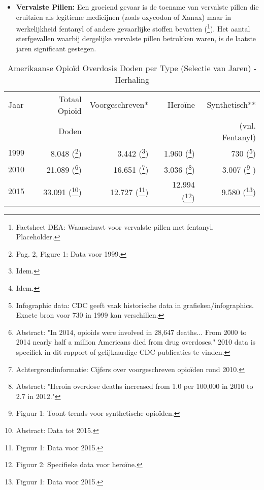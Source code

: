 \documentclass[11pt, a4paper]{report} %
\begin{document}
\begin{itemize}
    \item \textbf{Vervalste Pillen:} Een groeiend gevaar is de toename van vervalste pillen die eruitzien als legitieme medicijnen (zoals oxycodon of Xanax) maar in werkelijkheid fentanyl of andere gevaarlijke stoffen bevatten (\cite{DEA2022FentanylFactSheet}\footnote{Factsheet DEA: Waarschuwt voor vervalste pillen met fentanyl. Placeholder.}). Het aantal sterfgevallen waarbij dergelijke vervalste pillen betrokken waren, is de laatste jaren significant gestegen.
\end{itemize}

\begin{table}[htbp]
    \centering
    \caption{Amerikaanse Opioïd Overdosis Doden per Type (Selectie van Jaren) - Herhaling}
    \label{tab:overdose_data_repeat} %
    \begin{tabular}{l r r r r}
        \toprule
        Jaar & Totaal Opioïd & Voorgeschreven* & Heroïne & Synthetisch** \\
             & Doden         &              &         & (vnl. Fentanyl) \\
        \midrule
        1999 & 8.048   (\cite{Hedegaard2017OverdoseDeathsUS}\footnote{Pag. 2, Figure 1: Data voor 1999.})      & 3.442   (\cite{Hedegaard2017OverdoseDeathsUS}\footnote{Idem.})     & 1.960   (\cite{Hedegaard2017OverdoseDeathsUS}\footnote{Idem.}) & 730 (\cite{CDCUnderstandingEpidemic}\footnote{Infographic data: CDC geeft vaak historische data in grafieken/infographics. Exacte bron voor 730 in 1999 kan verschillen.}) \\
        2010 & 21.089  (\cite{Rudd2016IncreasesDrugOpioidOverdoseDeaths}\footnote{Abstract: "In 2014, opioids were involved in 28,647 deaths... From 2000 to 2014 nearly half a million Americans died from drug overdoses." 2010 data is specifiek in dit rapport of gelijkaardige CDC publicaties te vinden.})      & 16.651  (\cite{CDCVitalSigns2017}\footnote{Achtergrondinformatie: Cijfers over voorgeschreven opioïden rond 2010.})    & 3.036   (\cite{Rudd2014IncreasesHeroinOverdoseDeaths}\footnote{Abstract: "Heroin overdose deaths increased from 1.0 per 100,000 in 2010 to 2.7 in 2012."}) & 3.007 (\cite{CDC2022DataBrief457}\footnote{Figuur 1: Toont trends voor synthetische opioïden.} ) \\
        2015 & 33.091  (\cite{Rudd2016IncreasesDrugOpioidOverdoseDeaths}\footnote{Abstract: Data tot 2015.})      & 12.727  (\cite{CDCVitalSigns2017}\footnote{Figuur 1: Data voor 2015.})    & 12.994  (\cite{Rudd2016IncreasesDrugOpioidOverdoseDeaths}\footnote{Figuur 2: Specifieke data voor heroïne.}) & 9.580 (\cite{CDC2022DataBrief457}\footnote{Figuur 1: Data voor 2015.}) \\

\end{tabular}
\end{table}
\end{document}
